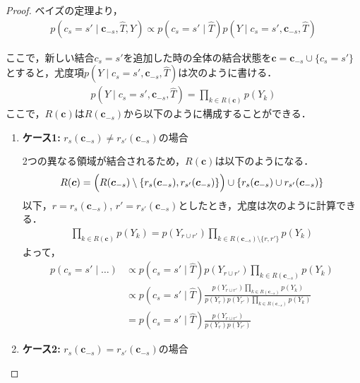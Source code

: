 \documentclass{jsarticle}
\theoremstyle{definition}
\begin{document}
\begin{enumerate}
\begin{proof}
ベイズの定理より，
\begin{align}
  p(c_s=s' \mid \bm{c}_{-s}, \hat{T}, Y) \propto p(c_s=s' \mid \hat{T}) p(Y \mid c_s=s', \bm{c}_{-s}, \hat{T})
\end{align}

ここで，新しい結合$c_s = s'$を追加した時の全体の結合状態を$\bm{c} = \bm{c}_{-s} \cup \{c_s=s'\}$ とすると，尤度項$p(Y \mid c_s=s', \bm{c}_{-s}, \hat{T})$は次のように書ける．
\begin{align}
  p(Y \mid c_s=s', \bm{c}_{-s}, \hat{T}) = \prod_{k \in R(\bm{c})} p(Y_k)
\end{align}
ここで，$R(\bm{c})$は$R(\bm{c}_{-s})$から以下のように構成することができる．
\begin{enumerate}
  \item \textbf{ケース1:}  $r_s(\bm{c}_{-s}) \neq r_{s'}(\bm{c}_{-s})$の場合
  
  2つの異なる領域が結合されるため，$R(\bm{c})$は以下のようになる．
  \begin{align}
    R(\bm{c}) = \Bigl( R(\bm{c}_{-s}) \setminus \{r_s(\bm{c}_{-s}), r_{s'}(\bm{c}_{-s})\} \Bigr) \cup \{r_s(\bm{c}_{-s}) \cup r_{s'}(\bm{c}_{-s})\}
  \end{align}
  以下，$r=r_s(\bm{c}_{-s})$, $r' = r_{s'}(\bm{c}_{-s})$としたとき，尤度は次のように計算できる．
  \begin{align}
  \prod_{k \in R(\bm{c})} p(Y_k) = p(Y_{r \cup r'}) \prod_{k \in R(\bm{c}_{-s}) \setminus \{r, r'\}} p(Y_k)
  \end{align}
  よって，
  \begin{align}
  p(c_s=s' \mid \dots)  &\propto p(c_s=s' \mid \hat{T}) p(Y_{r \cup r'})  \prod_{k \in R(\bm{c}_{-s})} p(Y_k) \\
  &\propto p(c_s=s' \mid \hat{T}) \frac{p(Y_{r \cup r'})  \prod_{k \in R(\bm{c}_{-s})} p(Y_k)}{p(Y_r)p(Y_{r'})\prod_{k \in R(\bm{c}_{-s})} p(Y_k)} \\
  &= p(c_s=s' \mid \hat{T}) \frac{p(Y_{r \cup r'})}{p(Y_r) p(Y_{r'})}
  \end{align}
  
  \item \textbf{ケース2:}  $r_s(\bm{c}_{-s}) = r_{s'}(\bm{c}_{-s})$の場合


\end{enumerate}
\end{proof}
\end{enumerate}
\end{document}
